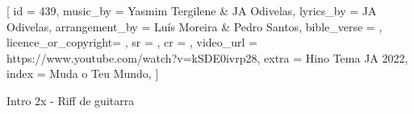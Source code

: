 [
    id                  = {439},
    music_by            = {Yasmim Tergilene & JA Odivelas}, %
    lyrics_by           = {JA Odivelas}, %
    arrangement_by      = {Luís Moreira & Pedro Santos}, %
    bible_verse         = {},
    licence_or_copyright= {},
    sr                  = {},
    cr                  = {},
    video_url           = {https://www.youtube.com/watch?v=kSDE0ivrp28}, %
    extra               = {Hino Tema JA 2022},
    index               = {Muda o Teu Mundo},
]

\beginverse
Intro 2x - Riff de guitarra
\endverse

\beginverse


